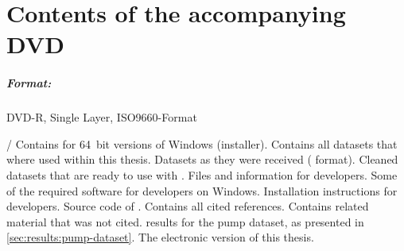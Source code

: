 \chapter{Contents of the accompanying DVD}\label{app:content-DVD}

\paragraph{Format:} 
		DVD-R, Single Layer, ISO9660-Format%

\begin{filelist}{/}
 Contains  for 64~bit versions of Windows (installer).
 Contains all datasets that where used within this thesis.
 Datasets as they were received ( format).
 Cleaned datasets that are ready to use with .
 Files and information for developers.
 Some of the required software for developers on Windows.
 Installation instructions for developers.
 Source code of .
 Contains all cited references.
 Contains related material that was not cited.
 \threed results for the pump dataset, as presented in \autoref{sec:results:pump-dataset}.
 The electronic version of this thesis.
\end{filelist}







